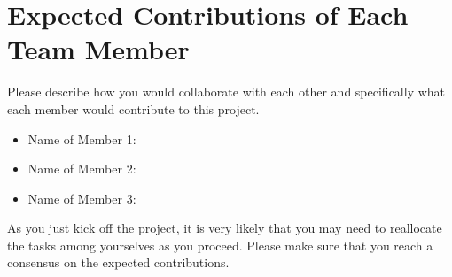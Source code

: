 \section{Expected Contributions of Each Team Member}
Please describe how you would collaborate with each other and specifically what each member would contribute to this project.
\begin{itemize}
    \item Name of Member 1:
    \item Name of Member 2:
    \item Name of Member 3:
\end{itemize}

As you just kick off the project, it is very likely that you may need to reallocate the tasks among yourselves as you proceed. Please make sure that you  reach a consensus on the expected contributions. 